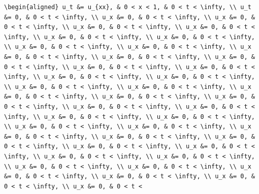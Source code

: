\documentclass[
  ukrainian,
]{article}
\begin{document}
\begin{verbatim}
\begin{aligned} u_t &= u_{xx}, & 0 < x < 1, & 0 < t < \infty, \\ u_t &= 0, & 0 < t < \infty, \\ u_x &= 0, & 0 < t < \infty, \\ u_x &= 0, & 0 < t < \infty, \\ u_x &= 0, & 0 < t < \infty, \\ u_x &= 0, & 0 < t < \infty, \\ u_x &= 0, & 0 < t < \infty, \\ u_x &= 0, & 0 < t < \infty, \\ u_x &= 0, & 0 < t < \infty, \\ u_x &= 0, & 0 < t < \infty, \\ u_x &= 0, & 0 < t < \infty, \\ u_x &= 0, & 0 < t < \infty, \\ u_x &= 0, & 0 < t < \infty, \\ u_x &= 0, & 0 < t < \infty, \\ u_x &= 0, & 0 < t < \infty, \\ u_x &= 0, & 0 < t < \infty, \\ u_x &= 0, & 0 < t < \infty, \\ u_x &= 0, & 0 < t < \infty, \\ u_x &= 0, & 0 < t < \infty, \\ u_x &= 0, & 0 < t < \infty, \\ u_x &= 0, & 0 < t < \infty, \\ u_x &= 0, & 0 < t < \infty, \\ u_x &= 0, & 0 < t < \infty, \\ u_x &= 0, & 0 < t < \infty, \\ u_x &= 0, & 0 < t < \infty, \\ u_x &= 0, & 0 < t < \infty, \\ u_x &= 0, & 0 < t < \infty, \\ u_x &= 0, & 0 < t < \infty, \\ u_x &= 0, & 0 < t < \infty, \\ u_x &= 0, & 0 < t < \infty, \\ u_x &= 0, & 0 < t < \infty, \\ u_x &= 0, & 0 < t < \infty, \\ u_x &= 0, & 0 < t < \infty, \\ u_x &= 0, & 0 < t < \infty, \\ u_x &= 0, & 0 < t < \infty, \\ u_x &= 0, & 0 < t < \infty, \\ u_x &= 0, & 0 < t < \infty, \\ u_x &= 0, & 0 < t < \infty, \\ u_x &= 0, & 0 < t < \infty, \\ u_x &= 0, & 0 < t < \infty, \\ u_x &= 0, & 0 < t < 
\end{verbatim}
\end{document}
